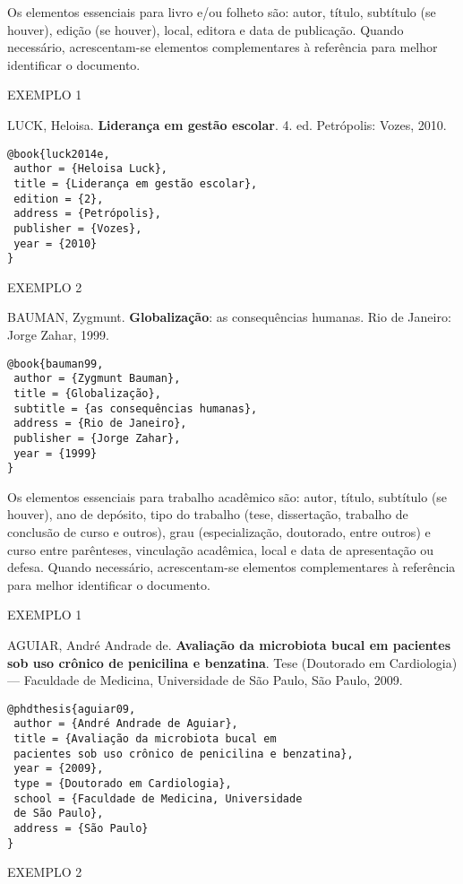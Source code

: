 Os elementos essenciais para livro e/ou folheto são: autor, título, subtítulo (se houver), edição (se houver), local, editora e data de publicação. Quando necessário, acrescentam-se elementos complementares à referência para melhor identificar o documento.

EXEMPLO 1

LUCK, Heloisa. \textbf{Liderança em gestão escolar}. 4. ed. Petrópolis: Vozes, 2010.

\begin{verbatim}
@book{luck2014e,
 author = {Heloisa Luck},
 title = {Liderança em gestão escolar},
 edition = {2},
 address = {Petrópolis},
 publisher = {Vozes},
 year = {2010}
}
\end{verbatim}

EXEMPLO 2

BAUMAN, Zygmunt. \textbf{Globalização}: as consequências humanas. Rio de Janeiro: Jorge Zahar, 1999.

\begin{verbatim}
@book{bauman99,
 author = {Zygmunt Bauman},
 title = {Globalização},
 subtitle = {as consequências humanas},
 address = {Rio de Janeiro},
 publisher = {Jorge Zahar},
 year = {1999}
}
\end{verbatim}

Os elementos essenciais para trabalho acadêmico são: autor, título, subtítulo (se houver), ano de depósito, tipo do trabalho (tese, dissertação, trabalho de conclusão de curso e outros), grau (especialização, doutorado, entre outros) e curso entre parênteses, vinculação acadêmica, local e data de apresentação ou defesa. Quando necessário, acrescentam-se elementos complementares à referência para melhor identificar o documento.

EXEMPLO 1

AGUIAR, André Andrade de. \textbf{Avaliação da microbiota bucal em pacientes sob uso crônico de penicilina e benzatina}. Tese (Doutorado em Cardiologia) — Faculdade de Medicina, Universidade de São Paulo, São Paulo, 2009.

\begin{verbatim}
@phdthesis{aguiar09,
 author = {André Andrade de Aguiar},
 title = {Avaliação da microbiota bucal em 
 pacientes sob uso crônico de penicilina e benzatina},
 year = {2009},
 type = {Doutorado em Cardiologia},
 school = {Faculdade de Medicina, Universidade 
 de São Paulo},
 address = {São Paulo}
}
\end{verbatim}

EXEMPLO 2

